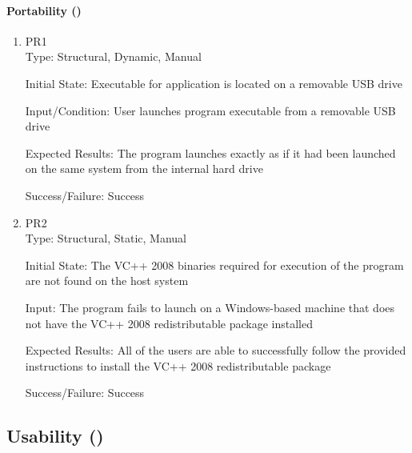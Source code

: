 \documentclass[12pt, titlepage]{article}
\begin{document}
	\paragraph{Portability ()}
	\begin{enumerate}
		\item{PR1\\}
		Type: Structural, Dynamic, Manual
		
		Initial State: Executable for application is located on a removable USB drive
		
		Input/Condition: User launches program executable from a removable USB drive
		
		Expected Results: The program launches exactly as if it had been launched on
		the same system from the internal hard drive

		Success/Failure: Success
		\item{PR2\\}
		Type: Structural, Static, Manual
		
		Initial State: The VC++ 2008 binaries required for execution of the program
		are not found on the host system
		
		Input: The program fails to launch on a Windows-based machine that does not
		have the VC++ 2008 redistributable package installed
		
		Expected Results: All of the users are able to successfully follow the provided
		instructions to install the VC++ 2008 redistributable package

		Success/Failure: Success
	\end{enumerate}

	\subsection{Usability ()}
\end{document}
